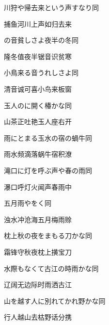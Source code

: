 \begin{haiku}
    {\FH 川狩や帰去来という声すなり}\hfill{\FH 同}

    {\FK 捕鱼河川上声如归去来}
\end{haiku}

\begin{haiku}
    {\FH {}の音貧しさよ夜半の冬}\hfill{\FH 同}

    {\FK 隆冬值夜半锯音识贫寒}
\end{haiku}

\begin{haiku}
    {\FH 小鳥来る音うれしさよ}\hfill{\FH 同}

    {\FK 清音诚可喜小鸟来板窗}
\end{haiku}

\begin{haiku}
    {\FH 玉人のに開く椿かな}\hfill{\FH 同}

    {\FK 山茶正吐艳玉人座右开}
\end{haiku}

\begin{haiku}
    {\FH 雨にとまる玉水の宿の蝸牛}\hfill{\FH 同}

    {\FK 雨水频滴落蜗牛宿积潦}
\end{haiku}

\begin{haiku}
    {\FH 滝口に灯を呼ぶ声や春の雨}\hfill{\FH 同}

    {\FK 瀑口呼灯火闻声春雨中}
\end{haiku}

\begin{haiku}
    {\FH 五月雨やをく}\hfill{\FH 同}

    {\FK 浊水冲沧海五月梅雨赊}
\end{haiku}

\begin{haiku}
    {\FH 枕上秋の夜をまもる刀かな}\hfill{\FH 同}

    {\FK 霜锋守秋夜枕上撗宝刀}
\end{haiku}

\begin{haiku}
    {\FH 水際もなくて古江の時雨かな}\hfill{\FH 同}

    {\FK 辽阔无边际时雨洒古江}
\end{haiku}

\begin{haiku}
    {\FH 山を越す人に別れてかれ野かな}\hfill{\FH 同}

    {\FK 行人越山去枯野话分携}
\end{haiku}

